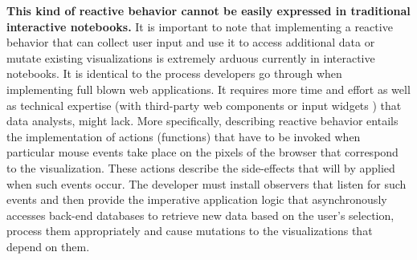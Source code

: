 {\bf This kind of reactive behavior cannot be easily expressed in traditional interactive notebooks.} It is important to note that implementing a reactive behavior that can collect user input and use it to access additional data or mutate existing visualizations is extremely arduous currently in interactive notebooks. It is identical to the process developers go through when implementing full blown web applications. It requires more time and effort as well as technical expertise (with third-party web components \cite{Bokeh, plotly} or input widgets \cite{ipywidgets}) that data analysts, might lack. More specifically, describing reactive behavior entails the implementation of actions (functions) that have to be invoked when particular mouse events take place on the pixels of the browser that correspond to the visualization. These actions describe the side-effects that will by applied when such events occur. The developer must install observers that listen for such events and then provide the imperative application logic that asynchronously accesses back-end databases to retrieve new data based on the user's selection, process them appropriately and cause mutations to the visualizations that depend on them. 


